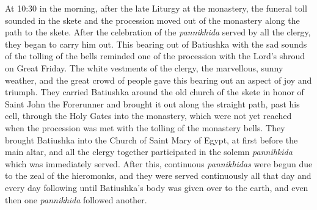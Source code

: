 At 10:30 in the morning, after the late Liturgy at the monastery, the funeral toll sounded in the skete and the procession moved out of the monastery along the path to the skete. After the celebration of the \textit{pannikhida} served by all the clergy, they began to carry him out. This bearing out of Batiushka with the sad sounds of the tolling of the bells reminded one of the procession with the Lord's shroud on Great Friday. The white vestments of the clergy, the marvellous, sunny weather, and the great crowd of people gave this bearing out an aspect of joy and triumph. They carried Batiushka around the old church of the skete in honor of Saint John the Forerunner and brought it out along the straight path, past his cell, through the \label{holy-gates}Holy Gates into the monastery, which were not yet reached when the procession was met with the tolling of the monastery bells. They brought Batiushka into the Church of Saint Mary of Egypt, at first before the main altar, and all the clergy together participated in the solemn \textit{pannihkida} which was immediately served. After this, continuous \textit{pannikhidas} were begun due to the zeal of the hieromonks, and they were served continuously all that day and every day following until Batiushka's body was given over to the earth, and even then one \textit{pannikhida} followed another.

